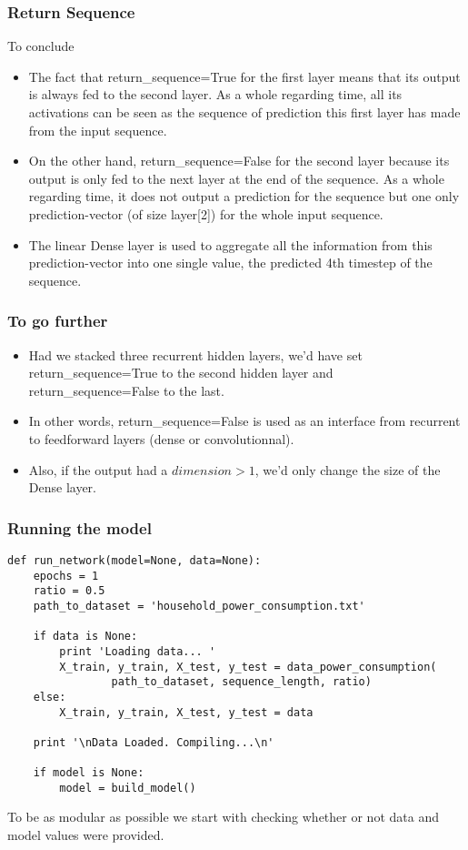 \begin{frame}[fragile] \frametitle{Return Sequence}
To conclude
\begin{itemize}
\item The fact that return\_sequence=True for the first layer means that its output is always fed to the second layer. As a whole regarding time, all its activations can be seen as the sequence of prediction this first layer has made from the input sequence.
\item On the other hand, return\_sequence=False for the second layer because its output is only fed to the next layer at the end of the sequence. As a whole regarding time, it does not output a prediction for the sequence but one only prediction-vector (of size layer[2]) for the whole input sequence. 
\item The linear Dense layer is used to aggregate all the information from this prediction-vector into one single value, the predicted 4th timestep of the sequence.
\end{itemize}
\end{frame}

\begin{frame}[fragile] \frametitle{To go further}
\begin{itemize}
\item Had we stacked three recurrent hidden layers, we'd have set return\_sequence=True to the second hidden layer and return\_sequence=False to the last. 
\item In other words, return\_sequence=False is used as an interface from recurrent to feedforward layers (dense or convolutionnal).

\item Also, if the output had a $dimension > 1$, we'd only change the size of the Dense layer.
\end{itemize}
\end{frame}

\begin{frame}[fragile] \frametitle{Running the model}
\begin{lstlisting}
def run_network(model=None, data=None):
    epochs = 1
    ratio = 0.5
    path_to_dataset = 'household_power_consumption.txt'
    
    if data is None:
        print 'Loading data... '
        X_train, y_train, X_test, y_test = data_power_consumption(
                path_to_dataset, sequence_length, ratio)
    else:
        X_train, y_train, X_test, y_test = data
    
    print '\nData Loaded. Compiling...\n'
    
    if model is None:
        model = build_model()
\end{lstlisting}   
To be as modular as possible we start with checking whether or not data and model values were provided. 
\end{frame}


